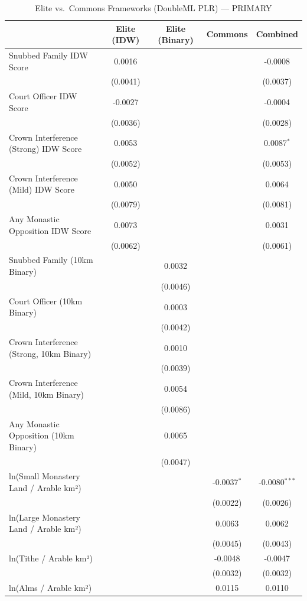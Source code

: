 \begin{table}[H]
\centering
\caption{Elite vs.\ Commons Frameworks (DoubleML PLR) --- PRIMARY}
\label{tab:aipw_primary}
\begin{tabular}{lcccc}
\hline\hline
 & Elite (IDW) & Elite (Binary) & Commons & Combined \\
\hline
Snubbed Family IDW Score & 0.0016 &  &  & -0.0008 \\
 & (0.0041) &  &  & (0.0037) \\
Court Officer IDW Score & -0.0027 &  &  & -0.0004 \\
 & (0.0036) &  &  & (0.0028) \\
Crown Interference (Strong) IDW Score & 0.0053 &  &  & 0.0087$^{*}$ \\
 & (0.0052) &  &  & (0.0053) \\
Crown Interference (Mild) IDW Score & 0.0050 &  &  & 0.0064 \\
 & (0.0079) &  &  & (0.0081) \\
Any Monastic Opposition IDW Score & 0.0073 &  &  & 0.0031 \\
 & (0.0062) &  &  & (0.0061) \\
Snubbed Family (10km Binary) &  & 0.0032 &  &  \\
 &  & (0.0046) &  &  \\
Court Officer (10km Binary) &  & 0.0003 &  &  \\
 &  & (0.0042) &  &  \\
Crown Interference (Strong, 10km Binary) &  & 0.0010 &  &  \\
 &  & (0.0039) &  &  \\
Crown Interference (Mild, 10km Binary) &  & 0.0054 &  &  \\
 &  & (0.0086) &  &  \\
Any Monastic Opposition (10km Binary) &  & 0.0065 &  &  \\
 &  & (0.0047) &  &  \\
ln(Small Monastery Land / Arable km²) &  &  & -0.0037$^{*}$ & -0.0080$^{***}$ \\
 &  &  & (0.0022) & (0.0026) \\
ln(Large Monastery Land / Arable km²) &  &  & 0.0063 & 0.0062 \\
 &  &  & (0.0045) & (0.0043) \\
ln(Tithe / Arable km²) &  &  & -0.0048 & -0.0047 \\
 &  &  & (0.0032) & (0.0032) \\
ln(Alms / Arable km²) &  &  & 0.0115 & 0.0110 \\

\end{tabular}
\end{table}
